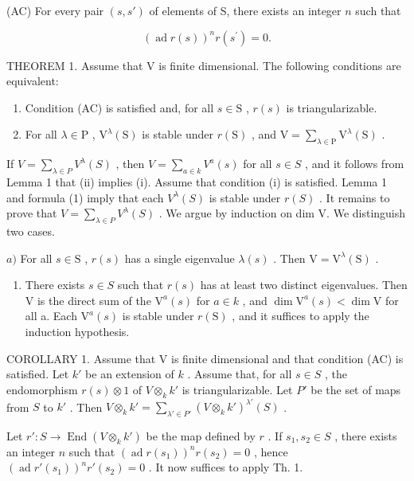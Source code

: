 (AC) For every pair \((s, s')\) of elements of S, there exists an integer \(n\) such that

\[
(\operatorname{ad} r (s)) ^ {n} r \left(s ^ {\prime}\right) = 0.
\]

THEOREM 1. Assume that V is finite dimensional. The following conditions are equivalent:

\begin{enumerate}
\def\labelenumi{(\roman{enumi})}
\item
  Condition (AC) is satisfied and, for all \(s \in \mathrm{S}\) , \(r(s)\) is triangularizable.
\item
  For all \(\lambda \in \mathrm{P}\) , \(\mathrm{V}^{\lambda}(\mathrm{S})\) is stable under \(r(\mathrm{S})\) , and \(\mathrm{V} = \sum_{\lambda \in \mathrm{P}} \mathrm{V}^{\lambda}(\mathrm{S})\) .
\end{enumerate}

If \(V = \sum_{\lambda \in P} V^{\lambda}(S)\) , then \(V = \sum_{a \in k} V^{a}(s)\) for all \(s \in S\) , and it follows from Lemma 1 that (ii) implies (i). Assume that condition (i) is satisfied. Lemma 1 and formula (1) imply that each \(V^{\lambda}(S)\) is stable under \(r(S)\) . It remains to prove that \(V = \sum_{\lambda \in P} V^{\lambda}(S)\) . We argue by induction on dim V. We distinguish two cases.

\(a)\) For all \(s \in \mathrm{S}\) , \(r(s)\) has a single eigenvalue \(\lambda(s)\) . Then \(\mathrm{V} = \mathrm{V}^{\lambda}(\mathrm{S})\) .

\begin{enumerate}
\def\labelenumi{\alph{enumi})}
\setcounter{enumi}{1}
\tightlist
\item
  There exists \(s \in S\) such that \(r(s)\) has at least two distinct eigenvalues. Then V is the direct sum of the \(\mathrm{V}^{a}(s)\) for \(a \in k\) , and \(\dim \mathrm{V}^{a}(s) < \dim \mathrm{V}\) for all a. Each \(\mathrm{V}^{a}(s)\) is stable under \(r(\mathrm{S})\) , and it suffices to apply the induction hypothesis.
\end{enumerate}

COROLLARY 1. Assume that V is finite dimensional and that condition (AC) is satisfied. Let \(k'\) be an extension of \(k\) . Assume that, for all \(s \in S\) , the endomorphism \(r(s) \otimes 1\) of \(V \otimes_k k'\) is triangularizable. Let \(P'\) be the set of maps from \(S\) to \(k'\) . Then \(V \otimes_k k' = \sum_{\lambda' \in P'} (V \otimes_k k')^{\lambda'}(S)\) .

Let \(r': S \to \operatorname{End}(V \otimes_k k')\) be the map defined by \(r\) . If \(s_1, s_2 \in S\) , there exists an integer \(n\) such that \((\operatorname{ad} r(s_1))^n r(s_2) = 0\) , hence \((\operatorname{ad} r'(s_1))^n r'(s_2) = 0\) . It now suffices to apply Th. 1.


